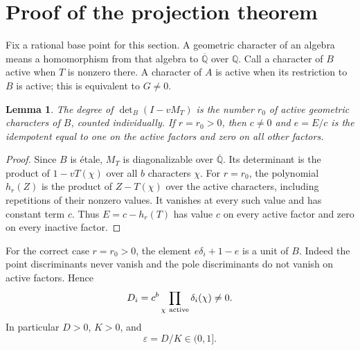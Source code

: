\documentclass[11pt,a4paper]{article}
\newtheorem{lemma}[theorem]{Lemma}
\newcommand{\Q}{\mathbb Q}\newcommand{\Z}{\mathbb Z}
\begin{document}
\section{Proof of the projection theorem}

Fix a rational base point for this section. A geometric character
of an algebra means a homomorphism from that algebra to
$\overline{\Q}$ over $\Q$. Call a character of $B$ active when
$T$ is nonzero there. A character of $A$ is active when its
restriction to $B$ is active; this is equivalent to $G\ne0$.

\begin{lemma}\label{lem:idempotent}
The degree of $\det_B(I-vM_T)$ is the number $r_0$ of active
geometric characters of $B$, counted individually.
If $r=r_0>0$, then $c\ne0$ and $e=E/c$ is the idempotent
equal to one on the active factors and zero on all other factors.
\end{lemma}
\begin{proof}
Since $B$ is \'etale, $M_T$ is diagonalizable over
$\overline{\Q}$. Its determinant is the product of
$1-vT(\chi)$ over all $b$ characters $\chi$.
For $r=r_0$, the polynomial $h_r(Z)$ is the product of
$Z-T(\chi)$ over the active characters, including repetitions
of their nonzero values. It vanishes at every such value and
has constant term $c$. Thus $E=c-h_r(T)$ has value $c$ on
every active factor and zero on every inactive factor.
\end{proof}

For the correct case $r=r_0>0$, the element
$e\delta_i+1-e$ is a unit of $B$. Indeed the point discriminants
never vanish and the pole discriminants do not vanish on active
factors. Hence
\begin{equation}\label{eq:Di}
 D_i=c^b\prod_{\chi\ {\rm active}}\delta_i(\chi)\ne0.
\end{equation}
In particular $D>0$, $K>0$, and
\[
                         \varepsilon=D/K\in(0,1].
\]
\end{document}
